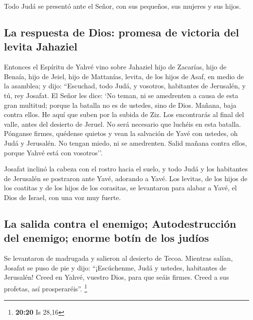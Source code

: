  Todo Judá se presentó ante el Señor, con sus pequeños,
sus mujeres y sus hijos.

\hypertarget{la-respuesta-de-dios-promesa-de-victoria-del-levita-jahaziel}{%
\subsection{La respuesta de Dios: promesa de victoria del levita
Jahaziel}\label{la-respuesta-de-dios-promesa-de-victoria-del-levita-jahaziel}}

 Entonces el Espíritu de Yahvé vino sobre Jahaziel hijo
de Zacarías, hijo de Benaía, hijo de Jeiel, hijo de Mattanías, levita,
de los hijos de Asaf, en medio de la asamblea;  y dijo:
``Escuchad, todo Judá, y vosotros, habitantes de Jerusalén, y tú, rey
Josafat. El Señor les dice: `No teman, ni se amedrenten a causa de esta
gran multitud; porque la batalla no es de ustedes, sino de Dios.
 Mañana, baja contra ellos. He aquí que suben por la
subida de Ziz. Los encontrarás al final del valle, antes del desierto de
Jeruel.  No será necesario que luchéis en esta batalla.
Pónganse firmes, quédense quietos y vean la salvación de Yavé con
ustedes, oh Judá y Jerusalén. No tengan miedo, ni se amedrenten. Salid
mañana contra ellos, porque Yahvé está con vosotros''.

 Josafat inclinó la cabeza con el rostro hacia el suelo,
y todo Judá y los habitantes de Jerusalén se postraron ante Yavé,
adorando a Yavé.  Los levitas, de los hijos de los
coatitas y de los hijos de los corasitas, se levantaron para alabar a
Yavé, el Dios de Israel, con una voz muy fuerte.

\hypertarget{la-salida-contra-el-enemigo-autodestrucciuxf3n-del-enemigo-enorme-botuxedn-de-los-juduxedos}{%
\subsection{La salida contra el enemigo; Autodestrucción del enemigo;
enorme botín de los
judíos}\label{la-salida-contra-el-enemigo-autodestrucciuxf3n-del-enemigo-enorme-botuxedn-de-los-juduxedos}}

 Se levantaron de madrugada y salieron al desierto de
Tecoa. Mientras salían, Josafat se puso de pie y dijo: ``¡Escúchenme,
Judá y ustedes, habitantes de Jerusalén! Creed en Yahvé, vuestro Dios,
para que seáis firmes. Creed a sus profetas, así prosperaréis''.
\footnote{\textbf{20:20} Is 28,16}

